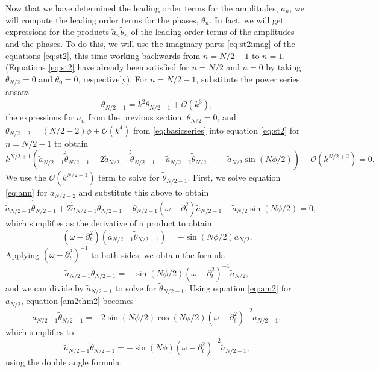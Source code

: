 \documentclass[11pt,reqno]{amsart}
\begin{document}
Now that we have determined the leading order terms for the amplitudes, $a_n$, we will compute the leading order terms for the phases, $\theta_n$. In fact, we will get expressions for the products $\widetilde{a}_n \widetilde{\theta}_n$ of the leading order terms of the amplitudes and the phases. To do this, we will use the imaginary parts \cref{eq:st2imag} of the equations \cref{eq:st2}, this time working backwards from $n = N/2-1$ to $n=1$. (Equations \cref{eq:st2} have already been satisfied for $n=N/2$ and $n=0$ by taking $\theta_{N/2} = 0$ and $\theta_0 = 0$, respectively). For $n=N/2-1$, substitute the power series ansatz
\[
\theta_{N/2-1} = k^2 \widetilde{\theta}_{N/2-1} + \mathcal{O}(k^{3}),
\]
the expressions for $a_n$ from the previous section, $\theta_{N/2} = 0$, and
$\theta_{N/2-2} = (N/2-2)\phi + \mathcal{O}(k^4)$ from \cref{eq:basicseries} into equation \cref{eq:st2} for $n=N/2-1$ to obtain
\[
k^{N/2+1} \left( \widetilde{a}_{N/2-1} \ddot{\widetilde{\theta}}_{N/2-1} + 2 \dot{\widetilde{a}}_{N/2-1} \dot{\widetilde{\theta}}_{N/2-1} - \widetilde{a}_{N/2-2} \widetilde{\theta}_{N/2-1} - \widetilde{a}_{N/2} \sin(N \phi/2) \right) + \mathcal{O}(k^{N/2+2}) = 0.
\]
We use the $\mathcal{O}(k^{N/2+1})$ term to solve for $\widetilde{\theta}_{N/2-1}$. First, we solve equation \cref{eq:ann} for $\widetilde{a}_{N/2-2}$ and substitute this above to obtain
\[
\widetilde{a}_{N/2-1} \ddot{\widetilde{\theta}}_{N/2-1} + 2 \dot{\widetilde{a}}_{N/2-1} \dot{\widetilde{\theta}}_{N/2-1} - \widetilde{\theta}_{N/2-1} (\omega - \partial_t^2) \widetilde{a}_{N/2-1} - \widetilde{a}_{N/2} \sin(N \phi/2) = 0,
\]
which simplifies as the derivative of a product to obtain
\[
(\omega - \partial_t^2)\left( \widetilde{a}_{N/2-1} \widetilde{\theta}_{N/2-1} \right) = -\sin(N \phi/2) \widetilde{a}_{N/2}.
\]
Applying $(\omega - \partial_t^2)^{-1}$ to both sides, we obtain the formula
\begin{equation}\label{am2thm2}
\widetilde{a}_{N/2-1} \widetilde{\theta}_{N/2-1} = -\sin(N \phi/2) (\omega - \partial_t^2)^{-1} \widetilde{a}_{N/2},
\end{equation}
and we can divide by $\widetilde{a}_{N/2-1}$ to solve for $\widetilde{\theta}_{N/2-1}$. Using equation \cref{eq:am2} for $\widetilde{a}_{N/2}$, equation \cref{am2thm2} becomes
\[
\widetilde{a}_{N/2-1} \widetilde{\theta}_{N/2-1} = -2 \sin(N \phi/2) \cos( N\phi/2) (\omega - \partial_t^2)^{-2} \widetilde{a}_{N/2-1},
\]
which simplifies to 
\begin{equation}\label{am2thm2a}
\widetilde{a}_{N/2-1} \widetilde{\theta}_{N/2-1} = -\sin(N \phi) (\omega - \partial_t^2)^{-2} \widetilde{a}_{N/2-1},
\end{equation}
using the double angle formula.
\end{document}
